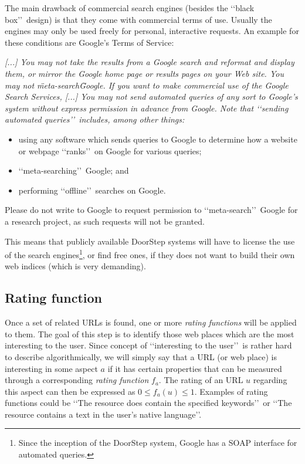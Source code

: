 \documentclass[a4paper]{danarticle}
\theoremstyle{remark}
\begin{document}
       The main drawback of commercial search engines (besides the \lq\lq black 
       box\rq\rq\ design) is that they come with commercial terms of use. 
       Usually the
       engines may only be used freely for personal, interactive requests. An 
       example for these conditions are Google's Terms of Service\cite{googletou}:
       \begin{center}
       \begin{minipage}{10cm}
       \itshape
       [...] You may not take the
       results from a Google search and reformat and display them, or mirror
       the Google home page or results pages on your Web site. You may not
       \"meta-search\" Google. If you want to make commercial use of the Google
       Search Services, 
       [...]
       You may not send automated queries of any sort to Google's system
       without express permission in advance from Google. Note that 
       \lq\lq sending
       automated queries\rq\rq\ includes, among other things:
       \begin{itemize}
       \item{using any software which sends queries to Google to determine how
             a website or webpage \lq\lq ranks\rq\rq\ on Google for various 
             queries;}
       \item{\lq\lq meta-searching\rq\rq\ Google; and}
       \item{performing \lq\lq offline\rq\rq\ searches on Google.}
       \end{itemize}
       Please do not write to Google to request permission to 
       \lq\lq meta-search\rq\rq\
       Google for a research project, as such requests will not be granted.
       \end{minipage}
       \end{center}
       This means that publicly available DoorStep systems will have to license 
       the use of the search 
       engines\footnote{Since the inception of the DoorStep system, Google has
       a SOAP interface for automated queries.}, 
       or find free ones, if they does not want to 
       build their own web indices (which is very demanding).
     \subsection{Rating function}
       Once a set of related URLs is found, one or more 
       \textit{rating functions} will be applied to them. The goal
       of this step is to identify those web places which are the
       most interesting to the user. Since concept of \lq\lq interesting to the
       user\rq\rq\ is rather hard to describe algorithmically, we will simply 
       say that a URL (or web place) is
       interesting in some aspect $ a $ if it has certain properties that can be
       measured through a corresponding \textit{rating function} 
       $ f_a $. The rating of an URL $ u $ regarding this aspect
       can then be expressed as $ 0 \leq f_a(u) \leq 1 $.
       Examples of rating
       functions could be \lq\lq The resource does contain the specified
       keywords\rq\rq\ or \lq\lq The resource contains a text in the user's
       native language\rq\rq .
       
\end{document}

